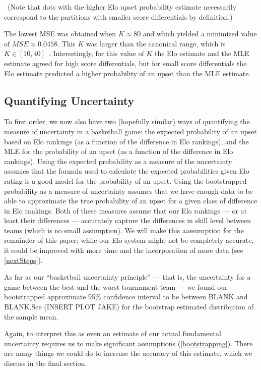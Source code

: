 \documentclass{article}
\begin{document}
\
(Note that dots with the higher Elo upset probability estimate necessarily correspond to the partitions with smaller score differentials by definition.)

The lowest MSE was obtained when $K\approx80$ and which yielded a minimized value of $MSE\approx0.0458$. This $K$ was larger than the canonical range, which is $K \in[10, 40]$~\cite{mediumRatingSystem}. Interestingly, for this value of $K$ the Elo estimate and the MLE estimate agreed for high score differentials, but for small score differentials the Elo estimate predicted a higher probability of an upset than the MLE estimate. 

\subsection{Quantifying Uncertainty}
To first order, we now also have two (hopefully similar) ways of quantifying the measure of uncertainty in a basketball game: the expected probability of an upset based on Elo rankings (as a function of the difference in Elo rankings), and the MLE for the probability of an upset (as a function of the difference in Elo rankings). Using the expected probability as a measure of the uncertainty assumes that the formula used to calculate the expected probabilities given Elo rating is a good model for the probability of an upset. Using the bootstrapped probability as a measure of uncertainty assumes that we have enough data to be able to approximate the true probability of an upset for a given class of difference in Elo rankings. Both of these measures assume that our Elo rankings --- or at least their differences --- accurately capture the differences in skill level between teams (which is no small assumption). We will make this aassumption for the remainder of this paper; while our Elo system might not be completely accurate, it could be improved with more time and the incorporation of more data (see \autoref{nextSteps}).

As far as our ``basketball uncertainty principle'' --- that is, the uncertainty for a game between the best and the worst tournament team --- we found our bootstrapped approximate 95\% confidence interval to be between BLANK and BLANK.\@ See (INSERT PLOT JAKE) for the bootstrap estimated distribution of the sample mean.

Again, to interpret this as even an estimate of our actual fundamental uncertainty requires us to make significant assumptions (\autoref{bootstrapping}). There are many things we could do to increase the accuracy of this estimate, which we discuss in the final section. 
\end{document}
